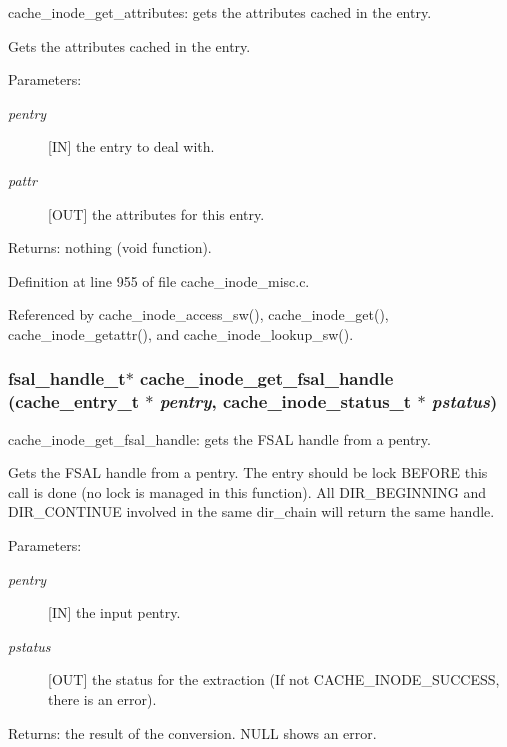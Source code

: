 cache\_\-inode\_\-get\_\-attributes: gets the attributes cached in the entry.

Gets the attributes cached in the entry.

\begin{Desc}
\item[Parameters:]
\begin{description}
\item[{\em pentry}][IN] the entry to deal with. \item[{\em pattr}][OUT] the attributes for this entry.\end{description}
\end{Desc}
\begin{Desc}
\item[Returns:]nothing (void function). \end{Desc}


Definition at line 955 of file cache\_\-inode\_\-misc.c.

Referenced by cache\_\-inode\_\-access\_\-sw(), cache\_\-inode\_\-get(), cache\_\-inode\_\-getattr(), and cache\_\-inode\_\-lookup\_\-sw().
\subsubsection{\setlength{\rightskip}{0pt plus 5cm}fsal\_\-handle\_\-t$\ast$ cache\_\-inode\_\-get\_\-fsal\_\-handle (cache\_\-entry\_\-t $\ast$ {\em pentry}, cache\_\-inode\_\-status\_\-t $\ast$ {\em pstatus})}\label{cache__inode__misc_8c_a10}


cache\_\-inode\_\-get\_\-fsal\_\-handle: gets the FSAL handle from a pentry.

Gets the FSAL handle from a pentry. The entry should be lock BEFORE this call is done (no lock is managed in this function). All DIR\_\-BEGINNING and DIR\_\-CONTINUE involved in the same dir\_\-chain will return the same handle.

\begin{Desc}
\item[Parameters:]
\begin{description}
\item[{\em pentry}][IN] the input pentry. \item[{\em pstatus}][OUT] the status for the extraction (If not CACHE\_\-INODE\_\-SUCCESS, there is an error).\end{description}
\end{Desc}
\begin{Desc}
\item[Returns:]the result of the conversion. NULL shows an error. \end{Desc}


